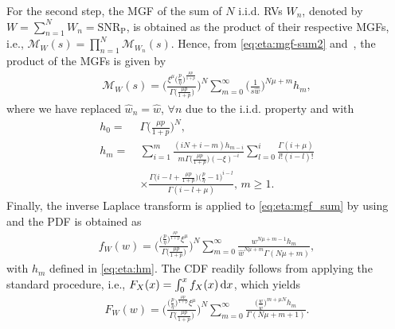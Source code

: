 \documentclass[journal,twocolumn]{IEEEtran}
\begin{document}
For the second step, the \ac{MGF} of the sum of $N$ \ac{i.i.d.} \acp{RV} $W_{n}$, denoted by $W = \sum_{n=1}^{N} W_{n} = \textrm{SNR}_{\textrm{P}}$, is obtained as the product of their respective \acp{MGF}, i.e., $\mathcal{M}_{W} (s) = \prod_{n=1}^{N} \mathcal{M}_{W_n} (s)$. Hence, from \eqref{eq:eta:mgf-sum2} and~\cite[Eq.~(0.314)]{Gra07}, the product of the \acp{MGF} is given by
\begin{align} \label{eq:eta:mgf_sum}
        \mathcal{M}_{W}(s) = \Bigg( \frac{\xi^{\mu} \big(\frac{p}{\eta }\big)^{\frac{\mu p}{1+p}}}{\Gamma \big(\frac{\mu  p}{1+p}\big)} \Bigg)^{N} \sum_{m=0}^{\infty}\bigg(\frac{1}{s \hat{w}}\bigg)^{N\mu +m} h_m,
\end{align}
where we have replaced $\hat{w}_{n} = \hat{w}$, $\forall n$ due to the \ac{i.i.d.} property and with
\begin{subequations} \label{eq:eta:hm}
\begin{align}
    h_0 = \ & \Gamma \bigg(\frac{\mu  p}{1+p}\bigg)^N, \label{eq:eta:hm0} \\
    h_m = \ & \sum _{i=1}^m  \frac{ (i N+i-m)  h_{m-i}}{m \Gamma \big(\frac{\mu  p}{1+p}\big) \left(-\xi\right)^{-i}} \sum _{l=0}^i\frac{ \Gamma(i+\mu)}{l! (i-l)! } \nonumber \\
    & \times \frac{ \Gamma \big(i-l+\frac{\mu p }{1+p}\big) \big(\frac{p}{\eta }-1\big)^{i-l}}{ \Gamma (i-l+\mu )}, \, m\geq 1. \label{eq:eta:hm1}
\end{align}
\end{subequations}
Finally, the inverse Laplace transform is applied to \eqref{eq:eta:mgf_sum} by using~\cite[Eq.~(17.13.3)]{Gra07} and the \ac{PDF} is obtained as
\begin{align} \label{eq:eta:pdf_snr}
        f_{W}(w) = \Bigg(\frac{\big(\frac{p}{\eta }\big)^{\frac{\mu  p}{1+p}} \xi^{\mu }}{\Gamma \big(\frac{\mu  p}{1+p}\big)}\Bigg)^N \sum _{m=0}^{\infty } \frac{ w^{N \mu + m-1} h_m}{\hat{w} ^{N \mu + m } \Gamma (N \mu + m )},
\end{align}
with $h_m$ defined in \eqref{eq:eta:hm}. The \ac{CDF} readily follows from applying the standard procedure, i.e., $F_X(x) = \int_0^{x} f_X(x)\mathop{}\!\mathrm{d} x $, which yields
\begin{align} \label{eq:eta:cdf_snr}
        F_{W}(w) = \Bigg(\frac{\big(\frac{p}{\eta }\big)^{\frac{\mu  p}{1+p}} \xi^{\mu }}{\Gamma \big(\frac{\mu  p}{1+p}\big)}\Bigg)^N \sum _{m=0}^{\infty } \frac{\big(\frac{w}{\hat{w}}\big)^{m+\mu  N} h_m }{\Gamma (N \mu + m +1)}.
\end{align}
\end{document}
